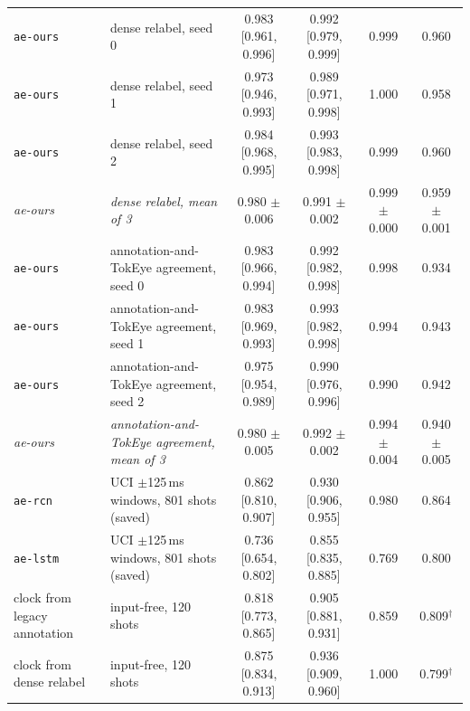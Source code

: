 \begin{table}[t]
\begin{tabular}{@{}l>{\raggedright\arraybackslash}p{1.3in}cccc@{}}
\texttt{ae-ours} & dense relabel, seed 0 & 0.983 [0.961, 0.996] & 0.992 [0.979, 0.999] & 0.999 & 0.960 \\
\texttt{ae-ours} & dense relabel, seed 1 & 0.973 [0.946, 0.993] & 0.989 [0.971, 0.998] & 1.000 & 0.958 \\
\texttt{ae-ours} & dense relabel, seed 2 & 0.984 [0.968, 0.995] & 0.993 [0.983, 0.998] & 0.999 & 0.960 \\
\textit{ae-ours} & \textit{dense relabel, mean of 3} & 0.980 $\pm$ 0.006 & 0.991 $\pm$ 0.002 & 0.999 $\pm$ 0.000 & 0.959 $\pm$ 0.001 \\
\texttt{ae-ours} & annotation-and-TokEye agreement, seed 0 & 0.983 [0.966, 0.994] & 0.992 [0.982, 0.998] & 0.998 & 0.934 \\
\texttt{ae-ours} & annotation-and-TokEye agreement, seed 1 & 0.983 [0.969, 0.993] & 0.993 [0.982, 0.998] & 0.994 & 0.943 \\
\texttt{ae-ours} & annotation-and-TokEye agreement, seed 2 & 0.975 [0.954, 0.989] & 0.990 [0.976, 0.996] & 0.990 & 0.942 \\
\textit{ae-ours} & \textit{annotation-and-TokEye agreement, mean of 3} & 0.980 $\pm$ 0.005 & 0.992 $\pm$ 0.002 & 0.994 $\pm$ 0.004 & 0.940 $\pm$ 0.005 \\
\texttt{ae-rcn} & UCI $\pm$125\,ms windows, 801 shots (saved) & 0.862 [0.810, 0.907] & 0.930 [0.906, 0.955] & 0.980 & 0.864 \\
\texttt{ae-lstm} & UCI $\pm$125\,ms windows, 801 shots (saved) & 0.736 [0.654, 0.802] & 0.855 [0.835, 0.885] & 0.769 & 0.800 \\
clock from legacy annotation & input-free, 120 shots & 0.818 [0.773, 0.865] & 0.905 [0.881, 0.931] & 0.859 & 0.809$^\dagger$ \\
clock from dense relabel & input-free, 120 shots & 0.875 [0.834, 0.913] & 0.936 [0.909, 0.960] & 1.000 & 0.799$^\dagger$ \\
\bottomrule
\end{tabular}
\end{table}

